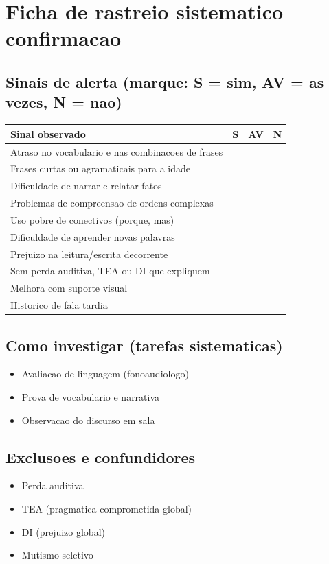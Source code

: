 \documentclass[a4paper,11pt]{book}
\begin{document}
\section*{Ficha de rastreio sistematico -- confirmacao}
\subsection*{Sinais de alerta (marque: S = sim, AV = as vezes, N = nao)}
\begin{tabular}{@{}p{11.5cm}ccc@{}}\toprule
Sinal observado & S & AV & N \\\midrule
Atraso no vocabulario e nas combinacoes de frases & & & \\
Frases curtas ou agramaticais para a idade & & & \\
Dificuldade de narrar e relatar fatos & & & \\
Problemas de compreensao de ordens complexas & & & \\
Uso pobre de conectivos (porque, mas) & & & \\
Dificuldade de aprender novas palavras & & & \\
Prejuizo na leitura/escrita decorrente & & & \\
Sem perda auditiva, TEA ou DI que expliquem & & & \\
Melhora com suporte visual & & & \\
Historico de fala tardia & & & \\
\bottomrule\end{tabular}
\subsection*{Como investigar (tarefas sistematicas)}
\begin{itemize}
\item Avaliacao de linguagem (fonoaudiologo)
\item Prova de vocabulario e narrativa
\item Observacao do discurso em sala
\end{itemize}
\subsection*{Exclusoes e confundidores}
\begin{itemize}
\item Perda auditiva
\item TEA (pragmatica comprometida global)
\item DI (prejuizo global)
\item Mutismo seletivo
\end{itemize}
\end{document}

